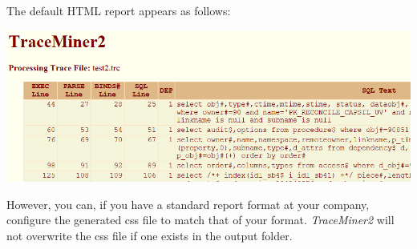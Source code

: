 \begin{appendix}
The default HTML report appears as follows:

\includegraphics[width=\textwidth]{Content/images/TraceMiner2.png}

However, you can, if you have a standard report format at your company,
configure the generated css file to match that of your format.
\emph{TraceMiner2} will not overwrite the css file if one exists in the
output folder.



\end{appendix}
